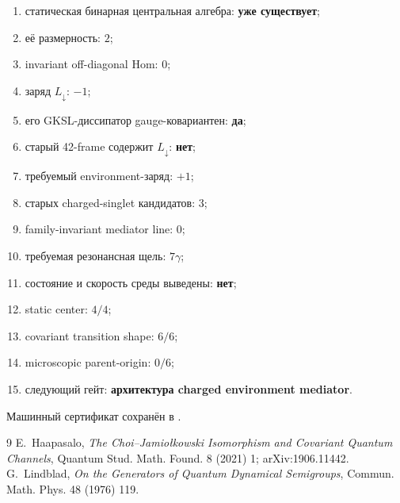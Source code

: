 \begin{protocol}\begin{enumerate}
\item статическая бинарная центральная алгебра: \textbf{уже существует};
\item её размерность: \textbf{$2$};
\item invariant off-diagonal Hom: \textbf{$0$};
\item заряд $L_\downarrow$: \textbf{$-1$};
\item его GKSL-диссипатор gauge-ковариантен: \textbf{да};
\item старый 42-frame содержит $L_\downarrow$: \textbf{нет};
\item требуемый environment-заряд: \textbf{$+1$};
\item старых charged-singlet кандидатов: \textbf{$3$};
\item family-invariant mediator line: \textbf{$0$};
\item требуемая резонансная щель: \textbf{$7\gamma$};
\item состояние и скорость среды выведены: \textbf{нет};
\item static center: \textbf{$4/4$};
\item covariant transition shape: \textbf{$6/6$};
\item microscopic parent-origin: \textbf{$0/6$};
\item следующий гейт: \textbf{архитектура charged environment mediator}.
\end{enumerate}\end{protocol}

Машинный сертификат сохранён в
.

\begin{thebibliography}{9}
 E.~Haapasalo,
\emph{The Choi--Jamio\l{}kowski Isomorphism and Covariant Quantum Channels},
Quantum Stud. Math. Found. 8 (2021) 1; arXiv:1906.11442.
 G.~Lindblad,
\emph{On the Generators of Quantum Dynamical Semigroups},
Commun. Math. Phys. 48 (1976) 119.
\end{thebibliography}